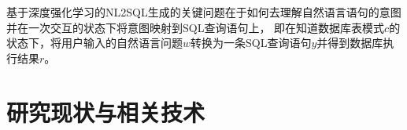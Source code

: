 基于深度强化学习的NL2SQL生成的关键问题在于如何去理解自然语言语句的意图并在一次交互的状态下将意图映射到SQL查询语句上，
即在知道数据库表模式$c$的状态下，将用户输入的自然语言问题$w$转换为一条SQL查询语句$y$并得到数据库执行结果$r$。



  


  

\section{研究现状与相关技术}
